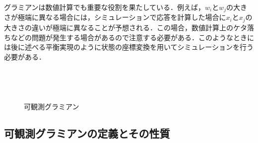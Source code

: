 グラミアンは数値計算でも重要な役割を果たしている．例えば，$w_i$と$w_j$の大きさが極端に異なる場合には，シミュレーションで応答を計算した場合に$x_i$と$x_j$の大きさの違いが極端に異なることが予想される．この場合，数値計算上のケタ落ちなどの問題が発生する場合があるので注意する必要がある．このようなときには後に述べる平衡実現のように状態の座標変換を用いてシミュレーションを行う必要がある．

\begin{figure}[htbp]
\begin{center}
\begin{minipage}[c]{7cm}
 \begin{center}
  \caption{可制御グラミアン}
  \label{fig:c_gram}
 \end{center}
\end{minipage}
\begin{minipage}{7cm}
 \begin{center}
  \caption{可観測グラミアン}
  \label{fig:o_gram}
 \end{center}
\end{minipage}
\end{center}
\end{figure}


\subsection{可観測グラミアンの定義とその性質}

